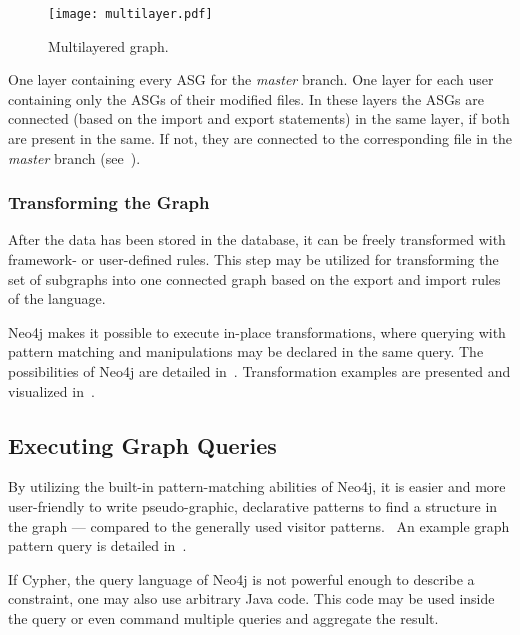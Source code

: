\begin{figure}[!htb]
  \centering
  \texttt{[image: multilayer.pdf]}
  \caption{Multilayered graph.}
  \label{fig:multilayered-graph}
\end{figure}

One layer containing every ASG for the \emph{master} branch. One layer for each user containing only the ASGs of their modified files. In these layers the ASGs are connected (based on the import and export statements) in the same layer, if both are present in the same. If not, they are connected to the corresponding file in the \emph{master} branch (see~).

\subsubsection{Transforming the Graph}
After the data has been stored in the database, it can be freely transformed with framework- or user-defined rules. This step may be utilized for transforming the set of subgraphs into one connected graph based on the export and import rules of the language.

Neo4j makes it possible to execute in-place transformations, where querying with pattern matching and manipulations may be declared in the same query. The possibilities of Neo4j are detailed in~. Transformation examples are presented and visualized in~.

\subsection{Executing Graph Queries}
By utilizing the built-in pattern-matching abilities of Neo4j, it is easier and more user-friendly to write pseudo-graphic, declarative patterns to find a structure in the graph --- compared to the generally used visitor patterns.~\cite{csmr} An example graph pattern query is detailed in~.

If Cypher, the query language of Neo4j is not powerful enough to describe a constraint, one may also use arbitrary Java code. This code may be used inside the query or even command multiple queries and aggregate the result.
